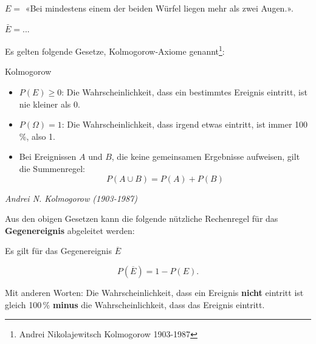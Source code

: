 $E=$ «Bei mindestens einem der beiden Würfel liegen
mehr als zwei Augen.».

$\bar{E} = ...$


\newpage




Es gelten folgende Gesetze, Kolmogorow-Axiome genannt\footnote{Andrei Nikolajewitsch
  Kolmogorow 1903-1987}:


\begin{axiom}{Kolmogorow}{}
\begin{itemize}

\item $P(E) \ge 0$: Die Wahrscheinlichkeit, dass ein bestimmtes Ereignis eintritt, ist nie kleiner als 0.

\item $P(\Omega) = 1$: Die Wahrscheinlichkeit, dass irgend etwas eintritt, ist immer 100\,\%, also 1.

\item Bei Ereignissen $A$ und $B$, die keine gemeinsamen Ergebnisse aufweisen, gilt die Summenregel:   $$P(A\cup B) = P(A) + P(B)$$

\end{itemize}
\end{axiom}

\begin{center}\textit{Andrei N. Kolmogorow (1903-1987)}\end{center}

\newpage

Aus den obigen Gesetzen kann die folgende nützliche Rechenregel für
das \textbf{Gegenereignis} abgeleitet werden:

\begin{gesetz}{}{}
  Es gilt für das Gegenereignis $\overline{E}$

  $$P(\overline{E}) = 1-P(E).$$

  Mit anderen Worten: Die
  Wahrscheinlichkeit, dass ein Ereignis \textbf{nicht} eintritt ist
  gleich 100\,\% \textbf{minus} die Wahrscheinlichkeit, dass das
  Ereignis eintritt.
\end{gesetz}


